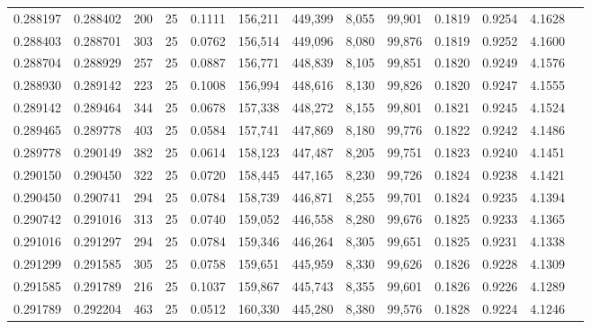 \begin{tabular}{rrrrrrrrrrrrr}
0.288197 & 0.288402 &   200 &  25 &                                     0.1111 & 156,211 & 449,399 &   8,055 &  99,901 & 0.1819 & 0.9254 & 4.1628 \\
0.288403 & 0.288701 &   303 &  25 &                                     0.0762 & 156,514 & 449,096 &   8,080 &  99,876 & 0.1819 & 0.9252 & 4.1600 \\
0.288704 & 0.288929 &   257 &  25 &                                     0.0887 & 156,771 & 448,839 &   8,105 &  99,851 & 0.1820 & 0.9249 & 4.1576 \\
0.288930 & 0.289142 &   223 &  25 &                                     0.1008 & 156,994 & 448,616 &   8,130 &  99,826 & 0.1820 & 0.9247 & 4.1555 \\
0.289142 & 0.289464 &   344 &  25 &                                     0.0678 & 157,338 & 448,272 &   8,155 &  99,801 & 0.1821 & 0.9245 & 4.1524 \\
0.289465 & 0.289778 &   403 &  25 &                                     0.0584 & 157,741 & 447,869 &   8,180 &  99,776 & 0.1822 & 0.9242 & 4.1486 \\
0.289778 & 0.290149 &   382 &  25 &                                     0.0614 & 158,123 & 447,487 &   8,205 &  99,751 & 0.1823 & 0.9240 & 4.1451 \\
0.290150 & 0.290450 &   322 &  25 &                                     0.0720 & 158,445 & 447,165 &   8,230 &  99,726 & 0.1824 & 0.9238 & 4.1421 \\
0.290450 & 0.290741 &   294 &  25 &                                     0.0784 & 158,739 & 446,871 &   8,255 &  99,701 & 0.1824 & 0.9235 & 4.1394 \\
0.290742 & 0.291016 &   313 &  25 &                                     0.0740 & 159,052 & 446,558 &   8,280 &  99,676 & 0.1825 & 0.9233 & 4.1365 \\
0.291016 & 0.291297 &   294 &  25 &                                     0.0784 & 159,346 & 446,264 &   8,305 &  99,651 & 0.1825 & 0.9231 & 4.1338 \\
0.291299 & 0.291585 &   305 &  25 &                                     0.0758 & 159,651 & 445,959 &   8,330 &  99,626 & 0.1826 & 0.9228 & 4.1309 \\
0.291585 & 0.291789 &   216 &  25 &                                     0.1037 & 159,867 & 445,743 &   8,355 &  99,601 & 0.1826 & 0.9226 & 4.1289 \\
0.291789 & 0.292204 &   463 &  25 &                                     0.0512 & 160,330 & 445,280 &   8,380 &  99,576 & 0.1828 & 0.9224 & 4.1246 \\

\end{tabular}
